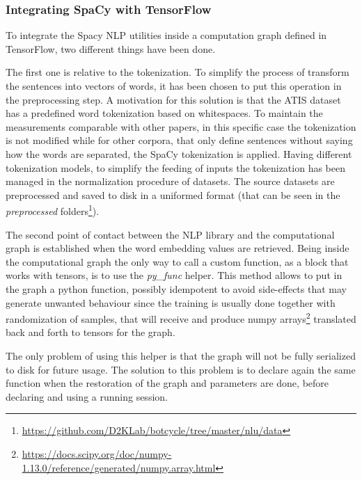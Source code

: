 \subsubsection{Integrating SpaCy with TensorFlow}
\label{implementationSpacyPyFunc}

To integrate the Spacy NLP utilities inside a computation graph defined in TensorFlow, two different things have been done.

The first one is relative to the tokenization. To simplify the process of transform the sentences into vectors of words, it has been chosen to put this operation in the preprocessing step. A motivation for this solution is that the ATIS dataset~\cite{hemphill1990atis} has a predefined word tokenization based on whitespaces. To maintain the measurements comparable with other papers, in this specific case the tokenization is not modified while for other corpora, that only define sentences without saying how the words are separated, the SpaCy tokenization is applied. Having different tokenization models, to simplify the feeding of inputs the tokenization has been managed in the normalization procedure of datasets. The source datasets are preprocessed and saved to disk in a uniformed format (that can be seen in the \textit{preprocessed} folders\footnote{\url{https://github.com/D2KLab/botcycle/tree/master/nlu/data}}).

The second point of contact between the NLP library and the computational graph is established when the word embedding values are retrieved. Being inside the computational graph the only way to call a custom function, as a block that works with tensors, is to use the \textit{py\_func} helper. This method allows to put in the graph a python function, possibly idempotent to avoid side-effects that may generate unwanted behaviour since the training is usually done together with randomization of samples, that will receive and produce numpy arrays\footnote{\url{https://docs.scipy.org/doc/numpy-1.13.0/reference/generated/numpy.array.html}} translated back and forth to tensors for the graph.

The only problem of using this helper is that the graph will not be fully serialized to disk for future usage. The solution to this problem is to declare again the same function when the restoration of the graph and parameters are done, before declaring and using a running session.


